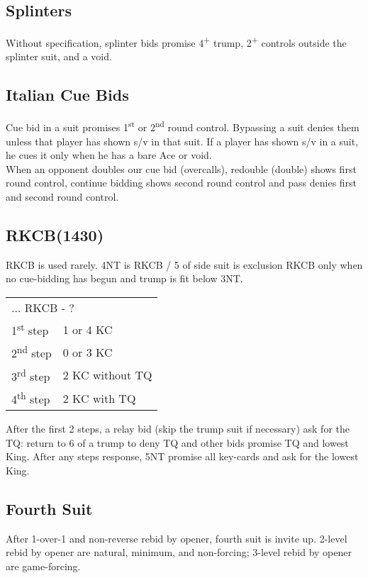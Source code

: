 \documentclass{article}
\newcommand{\nt}{\relsize{-1}NT\relsize{1}}
\newcommand{\up}{\textsuperscript{+}}
\begin{document}
\subsection{Splinters}
Without specification, splinter bids promise 4\up{} trump, 2\up{} controls outside the splinter suit, and a void.

\subsection{Italian Cue Bids}
Cue bid in a suit promises 1\textsuperscript{st} or 2\textsuperscript{nd} round control. Bypassing a suit denies them unless that player has shown s/v in that suit. If a player has shown s/v in a suit, he cues it only when he has a bare Ace or void. \\

When an opponent doubles our cue bid (overcalls), redouble (double) shows first round control, continue bidding shows second round control and pass denies first and second round control.

\subsection{RKCB(1430)}
RKCB is used rarely. 4\nt{} is RKCB / 5 of side suit is exclusion RKCB only when no cue-bidding has begun and trump is fit below 3\nt{}. \\

\begin{tabular}{|l|p{6.5cm}}
	\multicolumn{2}{l}{... RKCB - ?}\\
     1\textsuperscript{st} step & 1 or 4 KC \\
     2\textsuperscript{nd} step & 0 or 3 KC \\
     3\textsuperscript{rd} step & 2 KC without TQ \\
     4\textsuperscript{th} step & 2 KC with TQ
\end{tabular}

\medskip

After the first 2 steps, a relay bid (skip the trump suit if necessary) ask for the TQ: return to 6 of a trump to deny TQ and other bids promise TQ and lowest King.
After any steps response, 5\nt{} promise all key-cards and ask for the lowest King.

\subsection{Fourth Suit}
After 1-over-1 and non-reverse rebid by opener, fourth suit is invite up. 2-level rebid by opener are natural, minimum, and non-forcing; 3-level rebid by opener are game-forcing. \\
\end{document}

